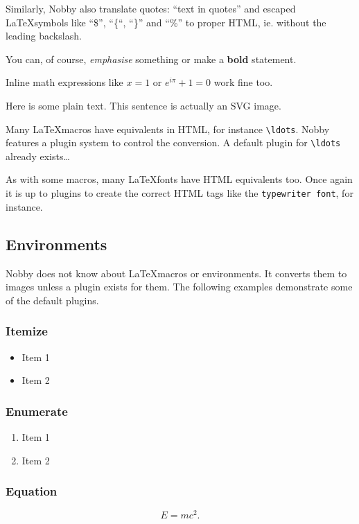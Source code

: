 \documentclass[10pt]{article}
\begin{document}
Similarly, Nobby also translate quotes: ``text in quotes'' and
escaped \LaTeX symbols like ``\$'', ``\{``, ``\}'' and ``\%'' to
proper HTML, ie. without the leading backslash.

You can, of course, \emph{emphasise} something or make a
\textbf{bold} statement.

Inline math expressions like $x=1$ or $e^{i\pi} + 1 = 0$ work fine too.

Here is some plain text. {{This sentence is actually an SVG image.}}

Many \LaTeX macros have equivalents in HTML, for instance
\texttt{\textbackslash{ldots}}. Nobby features a plugin system to
control the conversion. A default plugin for
\texttt{\textbackslash{ldots}} already exists\ldots

As with some macros, many \LaTeX fonts have HTML equivalents too. Once
again it is up to plugins to create the correct HTML tags like
the \texttt{typewriter font}, for instance.

\subsection{Environments}
Nobby does not know about \LaTeX macros or environments. It converts
them to images unless a plugin exists for them. The following examples
demonstrate some of the default plugins.

\subsubsection{Itemize}
\begin{itemize}
\item Item 1
\item Item 2
\end{itemize}

\subsubsection{Enumerate}
\begin{enumerate}
\item Item 1
\item Item 2
\end{enumerate}

\subsubsection{Equation}
\begin{equation}
  \label{eq:rel}
  E = mc^2.
\end{equation}
\end{document}
